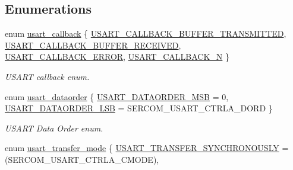 \subsection*{Enumerations}
\begin{DoxyCompactItemize}
\item 
enum \hyperlink{group__asfdoc__sam0__sercom__usart__group_gae257d5c9ac64a6835db020aa2458439d}{usart\+\_\+callback} \{ \hyperlink{group__asfdoc__sam0__sercom__usart__group_ggae257d5c9ac64a6835db020aa2458439da83df73f78d94d100d7d7e0f5840ca487}{U\+S\+A\+R\+T\+\_\+\+C\+A\+L\+L\+B\+A\+C\+K\+\_\+\+B\+U\+F\+F\+E\+R\+\_\+\+T\+R\+A\+N\+S\+M\+I\+T\+T\+E\+D}, 
\hyperlink{group__asfdoc__sam0__sercom__usart__group_ggae257d5c9ac64a6835db020aa2458439dad21b5e021545958df49158f3bbf21bd8}{U\+S\+A\+R\+T\+\_\+\+C\+A\+L\+L\+B\+A\+C\+K\+\_\+\+B\+U\+F\+F\+E\+R\+\_\+\+R\+E\+C\+E\+I\+V\+E\+D}, 
\hyperlink{group__asfdoc__sam0__sercom__usart__group_ggae257d5c9ac64a6835db020aa2458439da115952c86552b3dc3d94430a76e6f3a8}{U\+S\+A\+R\+T\+\_\+\+C\+A\+L\+L\+B\+A\+C\+K\+\_\+\+E\+R\+R\+O\+R}, 
\hyperlink{group__asfdoc__sam0__sercom__usart__group_ggae257d5c9ac64a6835db020aa2458439dad6e55cb6f0f87b63292fe063d76405b5}{U\+S\+A\+R\+T\+\_\+\+C\+A\+L\+L\+B\+A\+C\+K\+\_\+\+N}
 \}
\begin{DoxyCompactList}\small\item\em U\+S\+A\+R\+T callback enum. \end{DoxyCompactList}\item 
enum \hyperlink{group__asfdoc__sam0__sercom__usart__group_ga4352d9150bb8cbd54d26abe3055a5ee1}{usart\+\_\+dataorder} \{ \hyperlink{group__asfdoc__sam0__sercom__usart__group_gga4352d9150bb8cbd54d26abe3055a5ee1add3a3b7f39f32c42d22991ea981e2810}{U\+S\+A\+R\+T\+\_\+\+D\+A\+T\+A\+O\+R\+D\+E\+R\+\_\+\+M\+S\+B} = 0, 
\hyperlink{group__asfdoc__sam0__sercom__usart__group_gga4352d9150bb8cbd54d26abe3055a5ee1afb0c8f2d6f7da9f62dc67871d710b9af}{U\+S\+A\+R\+T\+\_\+\+D\+A\+T\+A\+O\+R\+D\+E\+R\+\_\+\+L\+S\+B} = S\+E\+R\+C\+O\+M\+\_\+\+U\+S\+A\+R\+T\+\_\+\+C\+T\+R\+L\+A\+\_\+\+D\+O\+R\+D
 \}
\begin{DoxyCompactList}\small\item\em U\+S\+A\+R\+T Data Order enum. \end{DoxyCompactList}\item 
enum \hyperlink{group__asfdoc__sam0__sercom__usart__group_ga7ff4d85053b8ea0904b5a57587b39c8f}{usart\+\_\+transfer\+\_\+mode} \{ \hyperlink{group__asfdoc__sam0__sercom__usart__group_gga7ff4d85053b8ea0904b5a57587b39c8fa4756b64694eb2e2ca4f4c77c6f53786d}{U\+S\+A\+R\+T\+\_\+\+T\+R\+A\+N\+S\+F\+E\+R\+\_\+\+S\+Y\+N\+C\+H\+R\+O\+N\+O\+U\+S\+L\+Y} = (S\+E\+R\+C\+O\+M\+\_\+\+U\+S\+A\+R\+T\+\_\+\+C\+T\+R\+L\+A\+\_\+\+C\+M\+O\+D\+E), 

\end{DoxyCompactItemize}
